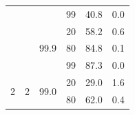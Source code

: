 \documentclass{article}
\begin{document}
\begin{table}
\begin{tabular}{|c|c|c|c|r|r|}
                                    &                                                                                        &                                                                                          & 99                                                                                      & 40.8                                                                      & 0.0                                                                       \\ \cline{3-6} 
                                    &                                                                                        & \multirow{3}{*}{99.9}                                                                    & 20                                                                                      & 58.2                                                                      & 0.6                                                                       \\ \cline{4-6} 
                                    &                                                                                        &                                                                                          & 80                                                                                      & 84.8                                                                      & 0.1                                                                       \\ \cline{4-6} 
                                    &                                                                                        &                                                                                          & 99                                                                                      & 87.3                                                                      & 0.0                                                                       \\ \hline
\multirow{12}{*}{2}                 & \multirow{6}{*}{2}                                                                     & \multirow{3}{*}{99.0}                                                                    & 20                                                                                      & 29.0                                                                       & 1.6                                                                       \\ \cline{4-6} 
                                    &                                                                                        &                                                                                          & 80                                                                                      & 62.0                                                                      & 0.4                                                                       \\ \cline{4-6} 

\end{tabular}
\end{table}
\end{document}
